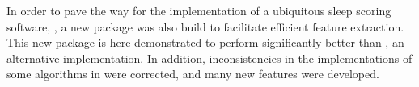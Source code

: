 In order to pave the way for the implementation of a ubiquitous sleep scoring software,
\pr, a new \py{} package was also build to facilitate efficient feature extraction.
This new package is here demonstrated to perform significantly better than \pyeeg{}\cite{bao_pyeeg:_2011}, an alternative implementation.
In addition, inconsistencies in the implementations of some algorithms in \pyeeg{} were corrected, and many new features were developed.

